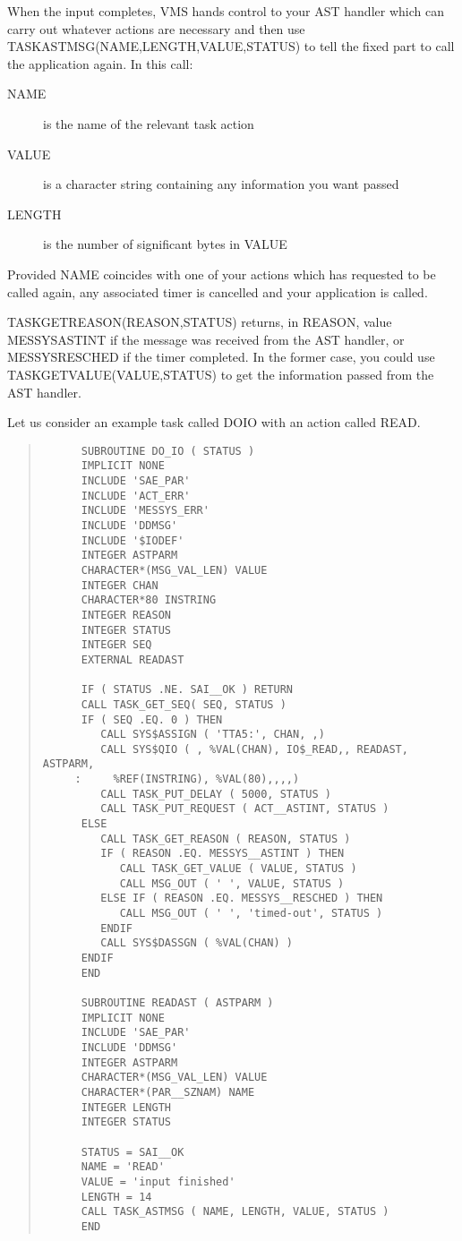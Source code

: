 \documentclass[twoside,11pt]{article}
\renewcommand{\_}{\texttt{\symbol{95}}}
\begin{document}
When the input completes, VMS hands control to your AST handler which
can carry out whatever actions are necessary and then use 
TASK\_ASTMSG(NAME,LENGTH,VALUE,STATUS) to tell the fixed part to call the 
application again. In this call:
\begin{description}
\item[NAME] is the name of the relevant task
action
\item[VALUE] is a character string containing any information you want 
passed
\item[LENGTH] is the number of significant bytes in VALUE
\end{description}

Provided NAME coincides with one of your actions which has requested to be 
called again, any associated timer is cancelled and your application is called.

TASK\_GET\_REASON(REASON,STATUS) returns, in REASON, value
MESSYS\_\_ASTINT if the message was received from the AST handler,
or MESSYS\_\-\_\-RESCHED if the timer completed.
In the former case, you could use 
TASK\_GET\_VALUE(VALUE,STATUS) to get the information passed from the AST 
handler.

Let us consider an example task called DO\_IO with an action called READ.


\small \begin{quote} \begin{verbatim}
      SUBROUTINE DO_IO ( STATUS )
      IMPLICIT NONE
      INCLUDE 'SAE_PAR'
      INCLUDE 'ACT_ERR'
      INCLUDE 'MESSYS_ERR'
      INCLUDE 'DDMSG'
      INCLUDE '$IODEF'
      INTEGER ASTPARM
      CHARACTER*(MSG_VAL_LEN) VALUE
      INTEGER CHAN
      CHARACTER*80 INSTRING
      INTEGER REASON
      INTEGER STATUS
      INTEGER SEQ
      EXTERNAL READAST

      IF ( STATUS .NE. SAI__OK ) RETURN
      CALL TASK_GET_SEQ( SEQ, STATUS )
      IF ( SEQ .EQ. 0 ) THEN
         CALL SYS$ASSIGN ( 'TTA5:', CHAN, ,)
         CALL SYS$QIO ( , %VAL(CHAN), IO$_READ,, READAST, ASTPARM, 
     :     %REF(INSTRING), %VAL(80),,,,)
         CALL TASK_PUT_DELAY ( 5000, STATUS )
         CALL TASK_PUT_REQUEST ( ACT__ASTINT, STATUS )
      ELSE
         CALL TASK_GET_REASON ( REASON, STATUS )
         IF ( REASON .EQ. MESSYS__ASTINT ) THEN
            CALL TASK_GET_VALUE ( VALUE, STATUS )
            CALL MSG_OUT ( ' ', VALUE, STATUS )
         ELSE IF ( REASON .EQ. MESSYS__RESCHED ) THEN
            CALL MSG_OUT ( ' ', 'timed-out', STATUS )
         ENDIF
         CALL SYS$DASSGN ( %VAL(CHAN) )
      ENDIF
      END

      SUBROUTINE READAST ( ASTPARM )
      IMPLICIT NONE
      INCLUDE 'SAE_PAR'
      INCLUDE 'DDMSG'
      INTEGER ASTPARM
      CHARACTER*(MSG_VAL_LEN) VALUE
      CHARACTER*(PAR__SZNAM) NAME
      INTEGER LENGTH
      INTEGER STATUS

      STATUS = SAI__OK
      NAME = 'READ'
      VALUE = 'input finished'
      LENGTH = 14
      CALL TASK_ASTMSG ( NAME, LENGTH, VALUE, STATUS )
      END
\end{verbatim} \end{quote} \normalsize
\end{document}
